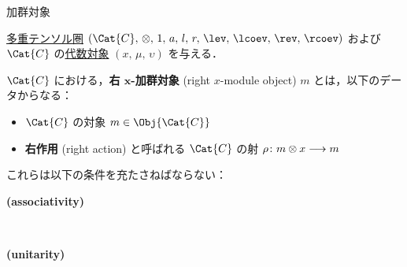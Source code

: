 \documentclass[TQFT_main]{subfiles}
\begin{document}
\begin{mydef}[label=def:moduleobj,breakable]{加群対象}
    \tcblower 

    \hyperref[def:tensorfusion-cat]{多重テンソル圏} $(\Cat{C},\, \otimes,\, 1,\, a,\, l,\, r,\, \lev,\, \lcoev,\, \rev,\, \rcoev)$ 
    および $\Cat{C}$ の\hyperref[def:algobj]{代数対象} $(x,\, \mu,\, \upsilon)$ を与える．
    
    $\Cat{C}$ における，\textbf{右 $\bm{x}$-加群対象} (right $x$-module object) $m$ とは，以下のデータからなる：
    \begin{itemize}
        \item $\Cat{C}$ の対象 $m \in \Obj{\Cat{C}}$ 
        \item \textbf{右作用} (right action) と呼ばれる $\Cat{C}$ の射 $\rho \colon m \otimes x \longrightarrow m$
    \end{itemize}
    これらは以下の条件を充たさねばならない：
    \begin{description}
        \item[\textbf{(associativity)}]　 
        
        \begin{center}
        \end{center}
        \item[\textbf{(unitarity)}]　 
        
        \begin{center}
        \end{center}
        
    \end{description}
    
\end{mydef}
\end{document}
